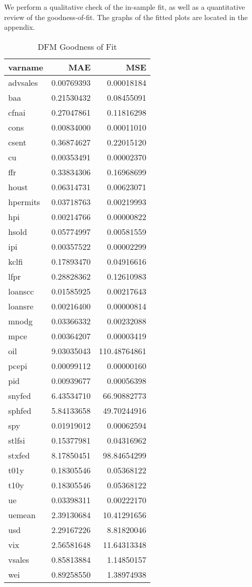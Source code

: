 \documentclass[11pt, letterpaper]{article}\usepackage[]{graphicx}\usepackage[]{color}
\begin{document}
We perform a qualitative check of the in-sample fit, as well as a quantitative review of the goodness-of-fit. The graphs of the fitted plots are located in the appendix.
\begin{table}[H]
\centering
\begingroup\footnotesize
\begin{tabular}{lrr}
  \hline
varname & MAE & MSE \\ 
  \hline
advsales & 0.00769393 & 0.00018184 \\ 
  baa & 0.21530432 & 0.08455091 \\ 
  cfnai & 0.27047861 & 0.11816298 \\ 
  cons & 0.00834000 & 0.00011010 \\ 
  csent & 0.36874627 & 0.22015120 \\ 
  cu & 0.00353491 & 0.00002370 \\ 
  ffr & 0.33834306 & 0.16968699 \\ 
  houst & 0.06314731 & 0.00623071 \\ 
  hpermits & 0.03718763 & 0.00219993 \\ 
  hpi & 0.00214766 & 0.00000822 \\ 
  hsold & 0.05774997 & 0.00581559 \\ 
  ipi & 0.00357522 & 0.00002299 \\ 
  kclfi & 0.17893470 & 0.04916616 \\ 
  lfpr & 0.28828362 & 0.12610983 \\ 
  loanscc & 0.01585925 & 0.00217643 \\ 
  loansre & 0.00216400 & 0.00000814 \\ 
  mnodg & 0.03366332 & 0.00232088 \\ 
  mpce & 0.00364207 & 0.00003419 \\ 
  oil & 9.03035043 & 110.48764861 \\ 
  pcepi & 0.00099112 & 0.00000160 \\ 
  pid & 0.00939677 & 0.00056398 \\ 
  snyfed & 6.43534710 & 66.90882773 \\ 
  sphfed & 5.84133658 & 49.70244916 \\ 
  spy & 0.01919012 & 0.00062594 \\ 
  stlfsi & 0.15377981 & 0.04316962 \\ 
  stxfed & 8.17850451 & 98.84654299 \\ 
  t01y & 0.18305546 & 0.05368122 \\ 
  t10y & 0.18305546 & 0.05368122 \\ 
  ue & 0.03398311 & 0.00222170 \\ 
  uemean & 2.39130684 & 10.41291656 \\ 
  usd & 2.29167226 & 8.81820046 \\ 
  vix & 2.56581648 & 11.64313348 \\ 
  vsales & 0.85813884 & 1.14850157 \\ 
  wei & 0.89258550 & 1.38974938 \\ 
   \hline
\end{tabular}
\endgroup
\caption{DFM Goodness of Fit} 
\end{table}
\end{document}
